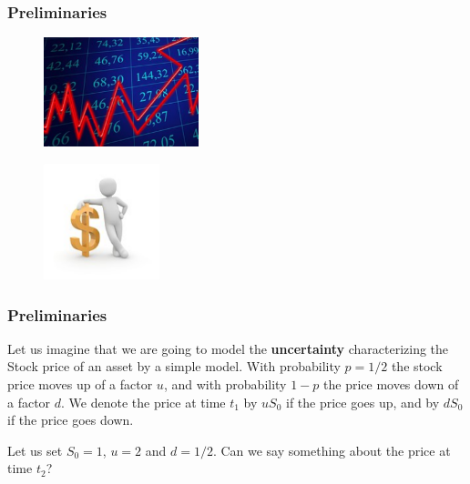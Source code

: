\documentclass[notes=show,handout]{beamer}
\begin{document}
\begin{frame}
\frametitle{Preliminaries}


\begin{figure}[h!]
\centering               
\includegraphics[width=0.4\textwidth,height=0.5\textheight]{profit.pdf}
\end{figure}


\begin{figure}[h!]
\begin{flushright}              
\includegraphics[width=0.3\textwidth,height=0.3\textheight]{tipoS.pdf}
\end{flushright}              
\end{figure}



\end{frame}



\begin{frame}
\frametitle{Preliminaries}

\begin{example} 
Let us imagine that we are going to model the  \textbf{uncertainty} characterizing the Stock price of an asset by a simple model. With probability $p=1/2$
the stock price moves up of a factor $u$, and with probability $1-p$ the price moves down of a factor $d$. We denote the price at time $t_1$  by $u S_0 $ if the price goes up, and by $d S_0 $  if the price goes down. \\ \vspace{1cm}

Let us set $S_0=1$, $u=2$ and $d=1/2$. Can we say something about the price at time $t_2$?
\end{example}

\end{frame}
\end{document}
